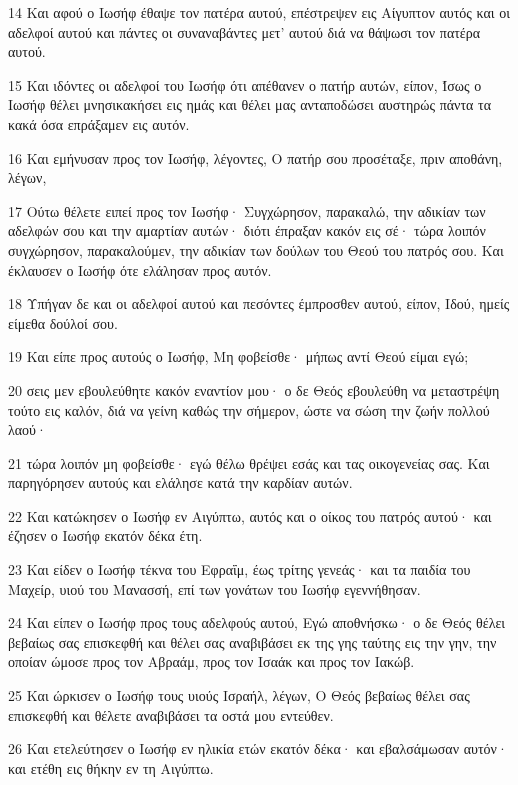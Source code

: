 \par 14 Και αφού ο Ιωσήφ έθαψε τον πατέρα αυτού, επέστρεψεν εις Αίγυπτον αυτός και οι αδελφοί αυτού και πάντες οι συναναβάντες μετ' αυτού διά να θάψωσι τον πατέρα αυτού.
\par 15 Και ιδόντες οι αδελφοί του Ιωσήφ ότι απέθανεν ο πατήρ αυτών, είπον, Ίσως ο Ιωσήφ θέλει μνησικακήσει εις ημάς και θέλει μας ανταποδώσει αυστηρώς πάντα τα κακά όσα επράξαμεν εις αυτόν.
\par 16 Και εμήνυσαν προς τον Ιωσήφ, λέγοντες, Ο πατήρ σου προσέταξε, πριν αποθάνη, λέγων,
\par 17 Ούτω θέλετε ειπεί προς τον Ιωσήφ· Συγχώρησον, παρακαλώ, την αδικίαν των αδελφών σου και την αμαρτίαν αυτών· διότι έπραξαν κακόν εις σέ· τώρα λοιπόν συγχώρησον, παρακαλούμεν, την αδικίαν των δούλων του Θεού του πατρός σου. Και έκλαυσεν ο Ιωσήφ ότε ελάλησαν προς αυτόν.
\par 18 Υπήγαν δε και οι αδελφοί αυτού και πεσόντες έμπροσθεν αυτού, είπον, Ιδού, ημείς είμεθα δούλοί σου.
\par 19 Και είπε προς αυτούς ο Ιωσήφ, Μη φοβείσθε· μήπως αντί Θεού είμαι εγώ;
\par 20 σεις μεν εβουλεύθητε κακόν εναντίον μου· ο δε Θεός εβουλεύθη να μεταστρέψη τούτο εις καλόν, διά να γείνη καθώς την σήμερον, ώστε να σώση την ζωήν πολλού λαού·
\par 21 τώρα λοιπόν μη φοβείσθε· εγώ θέλω θρέψει εσάς και τας οικογενείας σας. Και παρηγόρησεν αυτούς και ελάλησε κατά την καρδίαν αυτών.
\par 22 Και κατώκησεν ο Ιωσήφ εν Αιγύπτω, αυτός και ο οίκος του πατρός αυτού· και έζησεν ο Ιωσήφ εκατόν δέκα έτη.
\par 23 Και είδεν ο Ιωσήφ τέκνα του Εφραΐμ, έως τρίτης γενεάς· και τα παιδία του Μαχείρ, υιού του Μανασσή, επί των γονάτων του Ιωσήφ εγεννήθησαν.
\par 24 Και είπεν ο Ιωσήφ προς τους αδελφούς αυτού, Εγώ αποθνήσκω· ο δε Θεός θέλει βεβαίως σας επισκεφθή και θέλει σας αναβιβάσει εκ της γης ταύτης εις την γην, την οποίαν ώμοσε προς τον Αβραάμ, προς τον Ισαάκ και προς τον Ιακώβ.
\par 25 Και ώρκισεν ο Ιωσήφ τους υιούς Ισραήλ, λέγων, Ο Θεός βεβαίως θέλει σας επισκεφθή και θέλετε αναβιβάσει τα οστά μου εντεύθεν.
\par 26 Και ετελεύτησεν ο Ιωσήφ εν ηλικία ετών εκατόν δέκα· και εβαλσάμωσαν αυτόν· και ετέθη εις θήκην εν τη Αιγύπτω.





